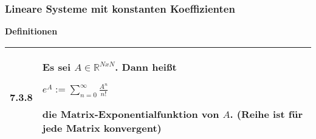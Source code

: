 \subsubsection{Lineare Systeme mit konstanten Koeffizienten}

    \noindent
    \textbf{Definitionen}
    \begin{table}[H]  
    \begin{tabularx}{\textwidth}{X m{16cm}}
        \toprule

        7.3.8 & Es sei $A\in \mathbb{R}^{NxN}$. Dann heißt \hfill \break
                \centerline{$ e^A := \sum^{\infty}_{n=0} \frac{A^n}{n!} $}
                die \textbf{Matrix-Exponentialfunktion} von $A$. \hfill \break
                (Reihe ist für jede Matrix konvergent)\\

        \bottomrule

    \end{tabularx}
    \end{table}

